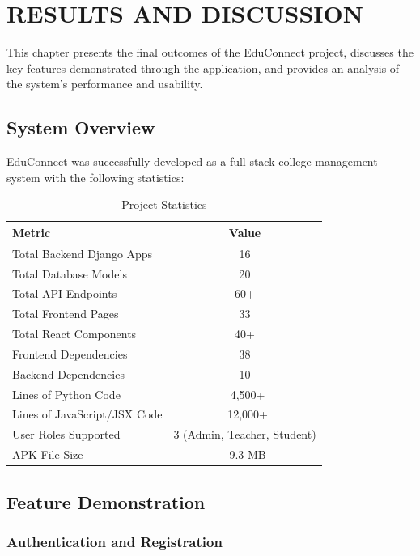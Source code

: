 \clearpage
\section{RESULTS AND DISCUSSION}
\hline

This chapter presents the final outcomes of the EduConnect project, discusses the key features demonstrated through the application, and provides an analysis of the system's performance and usability.

\subsection{System Overview}

EduConnect was successfully developed as a full-stack college management system with the following statistics:

\begin{table}[H]
\centering
\caption{Project Statistics}
\label{tab:project_stats}
\begin{tabular}{|l|c|}
\hline
\textbf{Metric} & \textbf{Value} \\
\hline
Total Backend Django Apps & 16 \\
\hline
Total Database Models & 20 \\
\hline
Total API Endpoints & 60+ \\
\hline
Total Frontend Pages & 33 \\
\hline
Total React Components & 40+ \\
\hline
Frontend Dependencies & 38 \\
\hline
Backend Dependencies & 10 \\
\hline
Lines of Python Code & ~4,500+ \\
\hline
Lines of JavaScript/JSX Code & ~12,000+ \\
\hline
User Roles Supported & 3 (Admin, Teacher, Student) \\
\hline
APK File Size & ~9.3 MB \\
\hline
\end{tabular}
\end{table}

\subsection{Feature Demonstration}

\subsubsection{Authentication and Registration}

